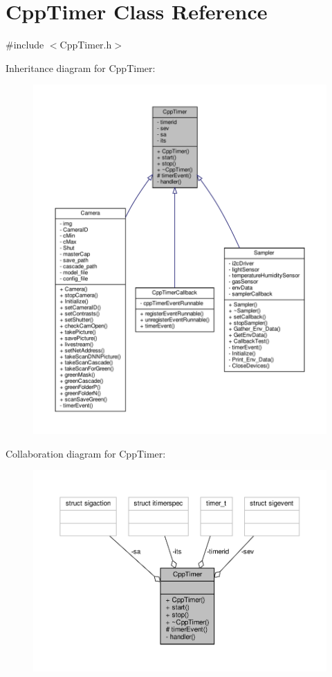 \hypertarget{classCppTimer}{}\section{Cpp\+Timer Class Reference}
\label{classCppTimer}


{\ttfamily \#include $<$Cpp\+Timer.\+h$>$}



Inheritance diagram for Cpp\+Timer\+:\nopagebreak
\begin{figure}[H]
\begin{center}
\leavevmode
\includegraphics[width=350pt]{classCppTimer__inherit__graph}
\end{center}
\end{figure}


Collaboration diagram for Cpp\+Timer\+:\nopagebreak
\begin{figure}[H]
\begin{center}
\leavevmode
\includegraphics[width=350pt]{classCppTimer__coll__graph}
\end{center}
\end{figure}
